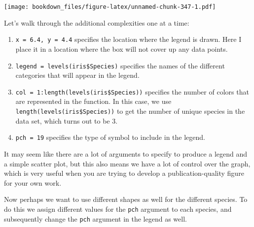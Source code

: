 \documentclass[]{krantz}
\makeatletter
\newenvironment{Shaded}{\begin{snugshade}}{\end{snugshade}}
\newcommand{\KeywordTok}[1]{\textcolor[rgb]{0.27,0.27,0.27}{\textbf{#1}}}
\newcommand{\DataTypeTok}[1]{\textcolor[rgb]{0.27,0.27,0.27}{#1}}
\newcommand{\DecValTok}[1]{\textcolor[rgb]{0.06,0.06,0.06}{#1}}
\newcommand{\FloatTok}[1]{\textcolor[rgb]{0.06,0.06,0.06}{#1}}
\newcommand{\StringTok}[1]{\textcolor[rgb]{0.5,0.5,0.5}{#1}}
\newcommand{\OperatorTok}[1]{\textcolor[rgb]{0.43,0.43,0.43}{\textbf{#1}}}
\newcommand{\NormalTok}[1]{#1}
\providecommand{\tightlist}{%
  \setlength{\itemsep}{0pt}\setlength{\parskip}{0pt}}
\newenvironment{kframe}{%
\medskip{}
\setlength{\fboxsep}{.8em}
 \def\at@end@of@kframe{}%
 \ifinner\ifhmode%
  \def\at@end@of@kframe{\end{minipage}}%
  \begin{minipage}{\columnwidth}%
 \fi\fi%
 \def\FrameCommand##1{\hskip\@totalleftmargin \hskip-\fboxsep
 \colorbox{shadecolor}{##1}\hskip-\fboxsep
     \hskip-\linewidth \hskip-\@totalleftmargin \hskip\columnwidth}%
 \MakeFramed {\advance\hsize-\width
   \@totalleftmargin\z@ \linewidth\hsize
   \@setminipage}}%
 {\par\unskip\endMakeFramed%
 \at@end@of@kframe}
\renewenvironment{Shaded}{\begin{kframe}}{\end{kframe}}
\makeatother
\begin{document}
\texttt{[image: bookdown\_files/figure-latex/unnamed-chunk-347-1.pdf]}

Let's walk through the additional complexities one at a time:

\begin{enumerate}
\def\labelenumi{\arabic{enumi}.}
\tightlist
\item
  \texttt{x\ =\ 6.4,\ y\ =\ 4.4} specifies the location where the legend
  is drawn. Here I place it in a location where the box will not cover
  up any data points.
\item
  \texttt{legend\ =\ levels(iris\$Species)} specifies the names of the
  different categories that will appear in the legend.
\item
  \texttt{col\ =\ 1:length(levels(iris\$Species))} specifies the number
  of colors that are represented in the function. In this case, we use
  \texttt{length(levels(iris\$Species))} to get the number of unique
  species in the data set, which turns out to be 3.
\item
  \texttt{pch\ =\ 19} specifies the type of symbol to include in the
  legend.
\end{enumerate}

It may seem like there are a lot of arguments to specify to produce a
legend and a simple scatter plot, but this also means we have a lot of
control over the graph, which is very useful when you are trying to
develop a publication-quality figure for your own work.

Now perhaps we want to use different shapes as well for the different
species. To do this we assign different values for the \texttt{pch}
argument to each species, and subsequently change the \texttt{pch}
argument in the legend as well.

\begin{Shaded}
\end{Shaded}
\end{document}

